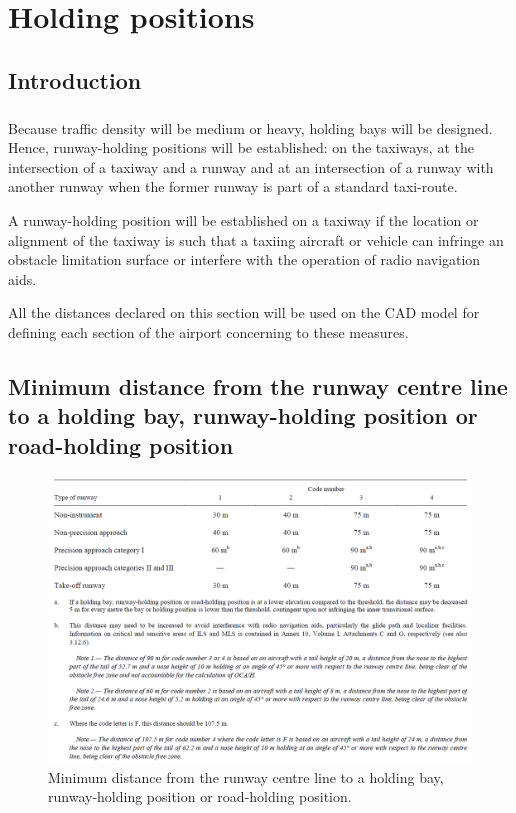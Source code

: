 \chapter{Holding positions}

	\section{Introduction}
	\paragraph{} Because traffic density will be medium or heavy, holding bays will be designed. Hence, runway-holding positions will be established:
	on the taxiways, at the intersection of a taxiway and a runway and at an intersection of a runway with another runway when the former runway is part of a standard taxi-route.
	
	A runway-holding position will be established on a taxiway if the location or alignment of the taxiway is such that a taxiing aircraft or vehicle can infringe an obstacle limitation surface or interfere with the operation of radio navigation aids.
	
	All the distances declared on this section will be used on the CAD model for defining each section of the airport concerning to these measures.
	
	\section{Minimum distance from the runway centre line to a holding bay, runway-holding position or road-holding position}
	
	\begin{figure}[H]
		\centering
		\includegraphics[clip, trim=0cm 0cm 0cm 0cm, width=1.1\textwidth]{./images/holding/distances}
		\caption{Minimum distance from the runway centre line to a holding bay, runway-holding position or road-holding position.}
		\label{distances}
	\end{figure}

